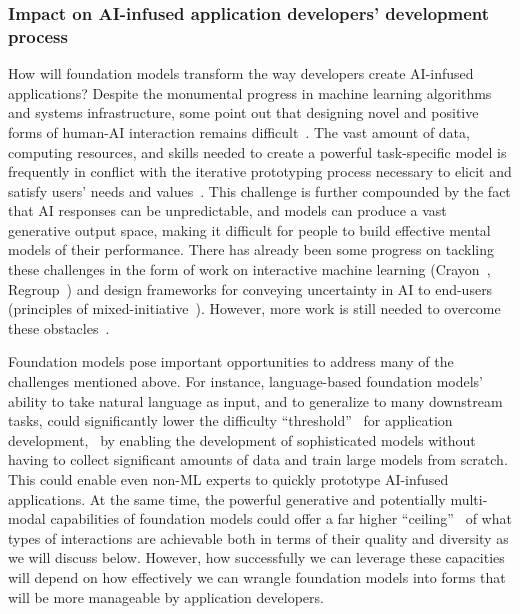 \subsubsection{Impact on AI-infused application developers' development process} 
How will foundation models transform the way developers create AI-infused applications? Despite the monumental progress in machine learning algorithms and systems infrastructure, some point out that designing novel and positive forms of human-AI interaction remains  difficult~\citep{Dove2017uxdesign, Cooper2014face}. The vast amount of data, computing resources, and skills needed to create a powerful task-specific model is frequently in conflict with the iterative prototyping process necessary to elicit and satisfy users' needs and values~\citep{Yang2016wireframing}. This challenge is further compounded by the fact that AI responses can be unpredictable, and models can produce a vast generative output space, making it difficult for people to build effective mental models of their performance. There has already been some progress on tackling these challenges in the form of work on interactive machine learning (\eg Crayon~\citep{Fails2003design}, Regroup~\citep{Amershi2012regroup}) and design frameworks for conveying uncertainty in AI to end-users (\eg principles of mixed-initiative~\citep{Horvitz1999mixedinit}). However, more work is still needed to overcome these obstacles~\citep{yang2020aiexamine}.

Foundation models pose important opportunities to address many of the challenges mentioned above. For instance, language-based foundation models' ability to take natural language as input, and to generalize to many downstream tasks, could significantly lower the difficulty ``threshold''~\citep{Myers2000ui} for application development, \ie~by enabling the development of sophisticated models without having to collect significant amounts of data and train large models from scratch. This could enable even non-ML experts to quickly prototype AI-infused applications. 
At the same time, the powerful generative and potentially multi-modal capabilities of foundation models could offer a far higher ``ceiling''~\citep{Myers2000ui} of what types of interactions are achievable both in terms of their quality and diversity as we will discuss below. However, how successfully we can leverage these capacities will depend on how effectively we can wrangle foundation models into forms that will be more manageable by application developers.

